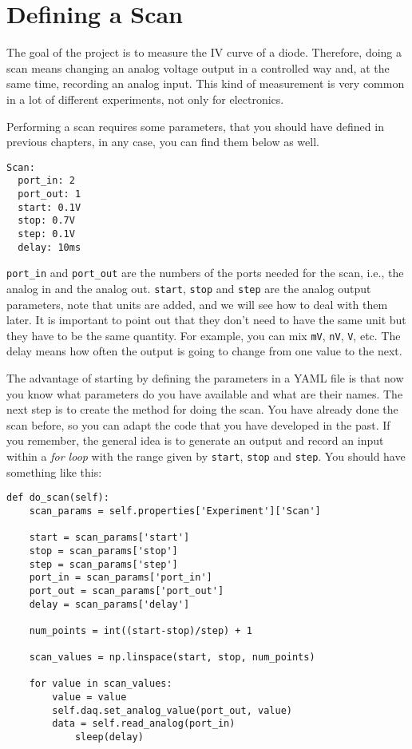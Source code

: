 \section{Defining a Scan}\label{defining-ascan}
The goal of the project is to measure the {IV} curve of a diode.
Therefore, doing a scan means changing an analog voltage output in a
controlled way and, at the same time, recording an analog input. This
kind of measurement is very common in a lot of different experiments,
not only for electronics.


Performing a scan requires some parameters, that you should have defined
in previous chapters, in any case, you can find them below as well.

\begin{verbatim}
Scan:
  port_in: 2
  port_out: 1
  start: 0.1V
  stop: 0.7V
  step: 0.1V
  delay: 10ms
\end{verbatim}

\texttt{port_in} and \texttt{port_out} are the numbers of the ports
needed for the scan, i.e., the analog in and the analog out.
\texttt{start}, \texttt{stop} and \texttt{step} are the analog output
parameters, note that units are added, and we will see how to deal with
them later. It is important to point out that they don't need to have
the same unit but they have to be the same quantity. For example, you
can mix \texttt{mV}, \texttt{nV}, \texttt{V}, etc. The delay means how
often the output is going to change from one value to the next.

The advantage of starting by defining the parameters in a {YAML} file is
that now you know what parameters do you have available and what are
their names. The next step is to create the method for doing the scan.
You have already done the scan before, so you can adapt the code that
you have developed in the past. If you remember, the general idea is to
generate an output and record an input within a \emph{for loop} with the
range given by \texttt{start}, \texttt{stop} and \texttt{step}. You
should have something like this:

\begin{verbatim}
def do_scan(self):
    scan_params = self.properties['Experiment']['Scan']
    
    start = scan_params['start']
    stop = scan_params['stop']
    step = scan_params['step']
    port_in = scan_params['port_in']
    port_out = scan_params['port_out']
    delay = scan_params['delay']

    num_points = int((start-stop)/step) + 1

    scan_values = np.linspace(start, stop, num_points)

    for value in scan_values:
        value = value
        self.daq.set_analog_value(port_out, value)
        data = self.read_analog(port_in)
            sleep(delay)
\end{verbatim}

